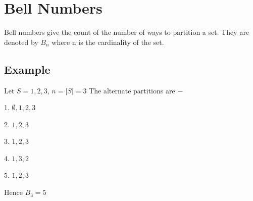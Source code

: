 
\section{Bell Numbers}
Bell numbers give the count of the number of ways to partition a set. 
They are denoted by $B_n$ where n is the cardinality of the set.

\subsection{Example}

Let $S={1,2,3}$, $n=|S|=3$
The alternate partitions are −

1. $∅,{1,2,3}$

2. ${1},{2,3}$

3. ${1,2},{3}$

4. ${1,3},{2}$

5. ${1},{2},{3}$

Hence $B_3=5$
